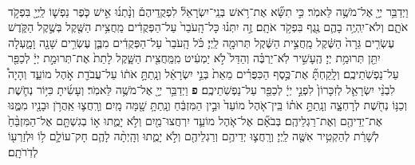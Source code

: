 \documentclass[twoside, openany, parskip=half, 11pt]{book}
\begin{document}
\begin{footnotesize}
\begin{multicols}{2}
\\
 וַיְדַבֵּ֥ר יְיָ֖ אֶל־מֹשֶׁ֥ה לֵּאמֹֽר׃ כִּ֣י תִשָּׂ֞א אֶת־רֹ֥אשׁ בְּנֵֽי־יִשְׂרָאֵל֘ לִפְקֻֽדֵיהֶם֒ וְנָ֨תְנ֜וּ אִ֣ישׁ כֹּ֧פֶר נַפְשׁ֛וֹ לַֽיְיָ֖ בִּפְקֹ֣ד אֹתָ֑ם וְלֹא־יִֽהְיֶ֥ה בָהֶ֛ם נֶ֖גֶף בִּפְקֹ֥ד אֹתָֽם׃ זֶ֣ה יִתְּנ֗וּ כָּל־הָֽעֹבֵר֙ עַל־הַפְּקֻדִ֔ים מַֽחֲצִ֥ית הַשֶּׁ֖קֶל בְּשֶׁ֣קֶל הַקֹּ֑דֶשׁ עֶשְׂרִ֤ים גֵּרָה֙ הַשֶּׁ֔קֶל מַֽחֲצִ֣ית הַשֶּׁ֔קֶל תְּרוּמָ֖ה לַֽיְיָ׃  כֹּ֗ל הָֽעֹבֵר֙ עַל־הַפְּקֻדִ֔ים מִבֶּ֛ן עֶשְׂרִ֥ים שָׁנָ֖ה וָמָ֑עְלָה יִתֵּ֖ן תְּרוּמַ֥ת יְיָ׃ הֶֽעָשִׁ֣יר לֹֽא־יַרְבֶּ֗ה וְהַדַּל֙ לֹ֣א יַמְעִ֔יט מִֽמַּֽחֲצִ֖ית הַשָּׁ֑קֶל לָתֵת֙ אֶת־תְּרוּמַ֣ת יְיָ֔ לְכַפֵּ֖ר עַל־נַפְשֹֽׁתֵיכֶֽם׃ וְלָֽקַחְתָּ֞ אֶת־כֶּ֣סֶף הַכִּפֻּרִ֗ים מֵאֵת֙ בְּנֵ֣י יִשְׂרָאֵ֔ל וְנָֽתַתָּ֣ אֹת֔וֹ עַל־עֲבֹדַ֖ת אֹ֣הֶל מוֹעֵ֑ד וְהָיָה֩ לִבְנֵ֨י יִשְׂרָאֵ֤ל לְזִכָּרוֹן֙ לִפְנֵ֣י יְיָ֔ לְכַפֵּ֖ר עַל־נַפְשֹֽׁתֵיכֶֽם׃ \textbf{פ} 
וַיְדַבֵּ֥ר יְיָ֖ אֶל־מֹשֶׁ֥ה לֵּאמֹֽר׃ וְעָשִׂ֜יתָ כִּיּ֥וֹר נְחֹ֛שֶׁת וְכַנּ֥וֹ נְחֹ֖שֶׁת לְרָחְצָ֑ה וְנָֽתַתָּ֣ אֹת֗וֹ בֵּֽין־אֹ֤הֶל מוֹעֵד֙ וּבֵ֣ין הַמִּזְבֵּ֔חַ וְנָֽתַתָּ֥ שָׁ֖מָּה מָֽיִם׃ וְרָֽחֲצ֛וּ אַֽהֲרֹ֥ן וּבָנָ֖יו מִמֶּ֑נּוּ אֶת־יְדֵיהֶ֖ם וְאֶת־רַגְלֵיהֶֽם׃ בְּבֹאָ֞ם אֶל־אֹ֧הֶל מוֹעֵ֛ד יִרְחֲצוּ־מַ֖יִם וְלֹ֣א יָמֻ֑תוּ א֣וֹ בְגִשְׁתָּ֤ם אֶל־הַמִּזְבֵּ֨חַ֙ לְשָׁרֵ֔ת לְהַקְטִ֥יר אִשֶּׁ֖ה לַֽיְיָ׃ וְרָֽחֲצ֛וּ יְדֵיהֶ֥ם וְרַגְלֵיהֶ֖ם וְלֹ֣א יָמֻ֑תוּ וְהָֽיְתָ֨ה לָהֶ֧ם חָק־עוֹלָ֛ם ל֥וֹ וּלְזַרְע֖וֹ לְדֹֽרֹתָֽם׃


\end{multicols}
\end{footnotesize}
\end{document}
